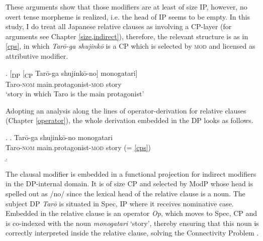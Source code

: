 \documentclass [output=book,colorlinks,citecolor=brown]{langscibook}
\begin{document}
These arguments show that those modifiers are at least of size IP, however, no overt tense morpheme is realized, i.e. the head of IP seems to be empty. In this study, I do treat all Japanese relative clauses as involving a CP-layer (for arguments see Chapter \ref{size,indirect}), therefore, the relevant structure is as in \ref{cps}, in which \textit{Tarō-ga shujinkō} is a CP which is selected by \textsc{mod} and licensed as attributive modifier. %

\exg. [\textsubscript{DP} [\textsubscript{CP} Tarō-ga shujinkō-no] monogatari]\\
{} {} Taro-\textsc{nom} main.protagonist-\textsc{mod} story\\
`story in which Taro is the main protagonist' \null \hfill \citep[66]{watanabe:2010:notes} \label{cps}

Adopting an analysis along the lines of operator-derivation for relative clauses (Chapter \ref{operator}), the whole derivation embedded in the DP looks as follows. %

\newpage

\ex. \label{shujinkonostructure} \ag. Tarō-ga shujinkō-no monogatari\\
Taro-\textsc{nom} main.protagonist-\textsc{mod} story (= \ref{cps})\\
\b. \hspace{-3.5cm} 

The clausal modifier is embedded in a functional projection for indirect modifiers in the DP-internal domain. It is of size CP and selected by ModP whose head is spelled out as /no/ since the lexical head of the relative clause is a noun. The subject DP \textit{Tarō} is situated in Spec, IP where it receives nominative case. Embedded in the relative clause is an operator \textit{Op}, which moves to Spec, CP and is co-indexed with the noun \textit{monogatari} `story’, thereby ensuring that this noun is correctly interpreted inside the relative clause, solving the Connectivity Problem \citep{salzmann:2017:reconstruction}.
\end{document}
